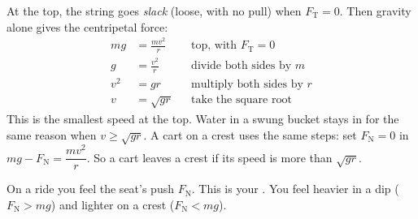 At the top, the string goes \emph{slack} (loose, with no pull) when $F_\mathrm{T} = 0$. Then
gravity alone gives the centripetal force:
\begin{align*}
  mg &= \frac{mv^2}{r} && \text{top, with } F_\mathrm{T} = 0\\
  g &= \frac{v^2}{r} && \text{divide both sides by } m\\
  v^2 &= gr && \text{multiply both sides by } r\\
  v &= \sqrt{gr} && \text{take the square root}
\end{align*}
This is the smallest speed at the top. Water in a swung bucket stays in for the same reason
when $v \geq \sqrt{gr}$. A cart on a crest uses the same steps: set $F_\mathrm{N} = 0$ in
$mg - F_\mathrm{N} = \dfrac{mv^2}{r}$. So a cart leaves a crest if its speed is more than
$\sqrt{gr}$.

On a ride you feel the seat's push $F_\mathrm{N}$. This is your . You feel
heavier in a dip ($F_\mathrm{N} > mg$) and lighter on a crest ($F_\mathrm{N} < mg$).


